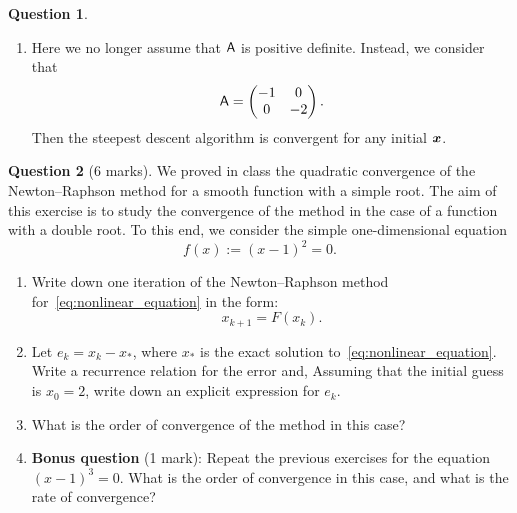 \documentclass[11pt]{article}
\theoremstyle{definition}
\newtheorem{question}{Question}
\begin{document}
\begin{question}
\begin{itemize}
\begin{enumerate}
            \item
                Here we no longer assume that $\mathsf A$ is positive definite.
                Instead, we consider that
                \[
                    \mathsf A =
                    \begin{pmatrix}
                        -1 & 0 \\ 0 & -2
                    \end{pmatrix}.
                \]
                Then the steepest descent algorithm is convergent for any initial $\mathbf{\boldsymbol{x}}$.
        \end{enumerate}
    \end{itemize}
\end{question}

\newpage
\begin{question}
    [6 marks]
    We proved in class the quadratic convergence of the Newton--Raphson method for a smooth function with a simple root.
    The aim of this exercise is to study the convergence of the method in the case of a function with a double root.
    To this end, we consider the simple one-dimensional equation
    \begin{equation}
        \label{eq:nonlinear_equation}
        f(x) := (x-1)^2 = 0.
    \end{equation}
    \begin{enumerate}
        \item
            Write down one iteration of the Newton--Raphson method for~\eqref{eq:nonlinear_equation} in the form:
            \[
                x_{k+1} = F(x_k).
            \]

        \item
            Let $e_k = x_k - x_*$, where $x_*$ is the exact solution to~\eqref{eq:nonlinear_equation}.
            Write a recurrence relation for the error and,
            Assuming that the initial guess is $x_0 = 2$,
            write down an explicit expression for $e_k$.

        \item
            What is the order of convergence of the method in this case?

        \item
            \textbf{Bonus question} (1 mark):
            Repeat the previous exercises for the equation $(x-1)^3 = 0$.
            What is the order of convergence in this case,
            and what is the rate of convergence?
    \end{enumerate}
\end{question}
\end{document}
